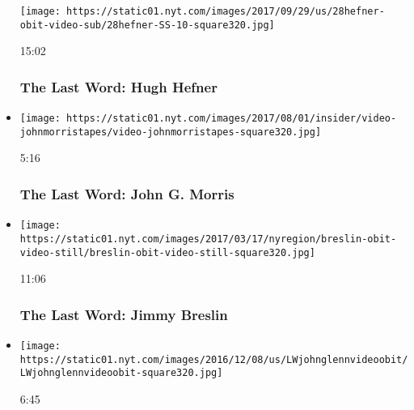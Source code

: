 \begin{itemize}
  \texttt{[image: https://static01.nyt.com/images/2017/09/29/us/28hefner-obit-video-sub/28hefner-SS-10-square320.jpg]}

  15:02

  \hypertarget{the-last-word-hugh-hefner}{%
  \subsubsection{The Last Word: Hugh
  Hefner}\label{the-last-word-hugh-hefner}}
\item
  \href{https://www.nytimes.com/video/obituaries/100000002453870/the-last-word-john-g-morris-obituary.html?action=click\&module=video-series-bar\&region=header\&pgtype=Article\&playlistId=video/last-word}{}

  \texttt{[image: https://static01.nyt.com/images/2017/08/01/insider/video-johnmorristapes/video-johnmorristapes-square320.jpg]}

  5:16

  \hypertarget{the-last-word-john-g-morris}{%
  \subsubsection{The Last Word: John G.
  Morris}\label{the-last-word-john-g-morris}}
\item
  \href{https://www.nytimes.com/video/business/media/100000001635210/the-last-word-jimmy-breslin.html?action=click\&module=video-series-bar\&region=header\&pgtype=Article\&playlistId=video/last-word}{}

  \texttt{[image: https://static01.nyt.com/images/2017/03/17/nyregion/breslin-obit-video-still/breslin-obit-video-still-square320.jpg]}

  11:06

  \hypertarget{the-last-word-jimmy-breslin}{%
  \subsubsection{The Last Word: Jimmy
  Breslin}\label{the-last-word-jimmy-breslin}}
\item
  \href{https://www.nytimes.com/video/us/100000004812141/the-last-word-john-glenn.html?action=click\&module=video-series-bar\&region=header\&pgtype=Article\&playlistId=video/last-word}{}

  \texttt{[image: https://static01.nyt.com/images/2016/12/08/us/LWjohnglennvideoobit/LWjohnglennvideoobit-square320.jpg]}

  6:45

  \hypertarget{the-last-word-john-glenn}{%
}
\end{itemize}
